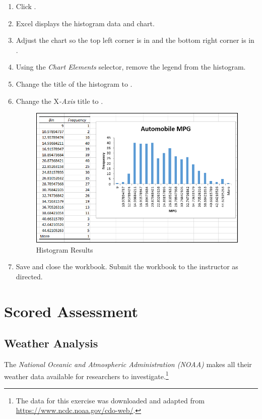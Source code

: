 \begin{enumerate}[resume]
	\item Click .
	\item Excel displays the histogram data and chart. 
	\item Adjust the chart so the top left corner is in  and the bottom right corner is in .
	\item Using the \textit{Chart Elements} selector, remove the legend from the histogram.
	\item Change the title of the histogram to .
	\item Change the X\textit{-Axis} title to .

	\begin{figure}[H]
		\centering
		\includegraphics[width=\maxwidth{.95\linewidth}]{gfx/ch09_fig77}
		\caption{Histogram Results}
		\label{09:fig77}
	\end{figure}
	
	\item Save and close the  workbook. Submit the workbook to the instructor as directed.

\end{enumerate}


\section{Scored Assessment}

\subsection{Weather Analysis}

The \textit{National Oceanic and Atmospheric Administration (NOAA)} makes all their weather data available for researchers to investigate.\footnote{The data for this exercise was downloaded and adapted from \url{https://www.ncdc.noaa.gov/cdo-web/}.}

